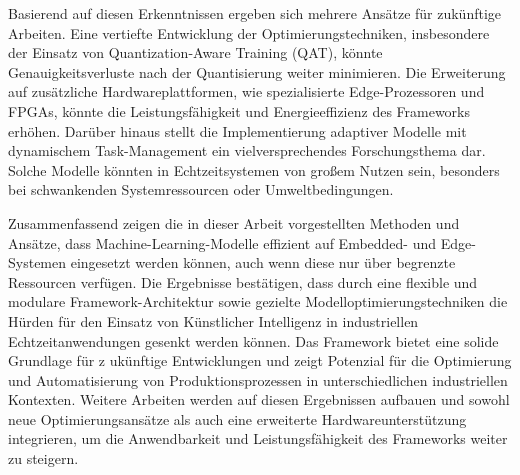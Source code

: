 Basierend auf diesen Erkenntnissen ergeben sich mehrere Ansätze für zukünftige Arbeiten. Eine vertiefte Entwicklung der Optimierungstechniken, 
insbesondere der Einsatz von Quantization-Aware Training (QAT), könnte Genauigkeitsverluste nach der Quantisierung weiter minimieren. 
Die Erweiterung auf zusätzliche Hardwareplattformen, wie spezialisierte Edge-Prozessoren und FPGAs, könnte die Leistungsfähigkeit und 
Energieeffizienz des Frameworks erhöhen. Darüber hinaus stellt die Implementierung adaptiver Modelle mit dynamischem Task-Management ein 
vielversprechendes Forschungsthema dar. Solche Modelle könnten in Echtzeitsystemen von großem Nutzen sein, besonders bei schwankenden 
Systemressourcen oder Umweltbedingungen.

Zusammenfassend zeigen die in dieser Arbeit vorgestellten Methoden und Ansätze, dass Machine-Learning-Modelle effizient auf Embedded- und 
Edge-Systemen eingesetzt werden können, auch wenn diese nur über begrenzte Ressourcen verfügen. Die Ergebnisse bestätigen, 
dass durch eine flexible und modulare Framework-Architektur sowie gezielte Modelloptimierungstechniken die Hürden für den Einsatz von 
Künstlicher Intelligenz in industriellen Echtzeitanwendungen gesenkt werden können. Das Framework bietet eine solide Grundlage für z
ukünftige Entwicklungen und zeigt Potenzial für die Optimierung und Automatisierung von Produktionsprozessen in unterschiedlichen industriellen Kontexten. 
Weitere Arbeiten werden auf diesen Ergebnissen aufbauen und sowohl neue Optimierungsansätze als auch eine erweiterte Hardwareunterstützung integrieren, 
um die Anwendbarkeit und Leistungsfähigkeit des Frameworks weiter zu steigern.